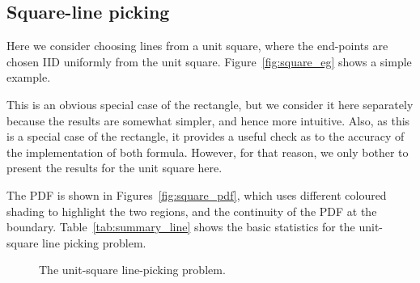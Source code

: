 \subsection{Square-line picking}
\label{sec:square_line}

Here we consider choosing lines from a unit square, where the
end-points are chosen IID uniformly from the unit
square. Figure~\ref{fig:square_eg} shows a simple example.

This is an obvious special case of the rectangle, but we consider it
here separately because the results are somewhat simpler, and hence
more intuitive. Also, as this is a special case of the rectangle, it
provides a useful check as to the accuracy of the implementation of
both formula. However, for that reason, we only bother to present the
results for the unit square here.

The PDF is shown in Figures~\ref{fig:square_pdf}, which uses different
coloured shading to highlight the two regions, and the continuity of
the PDF at the boundary. Table~\ref{tab:summary_line} shows the basic
statistics for the unit-square line picking problem.

\begin{figure}[htbp]
  \begin{center}
       \hspace{0.075\columnwidth}
    \caption{The unit-square line-picking problem.}
  \end{center} 
\vspace{-4mm}
\end{figure}

